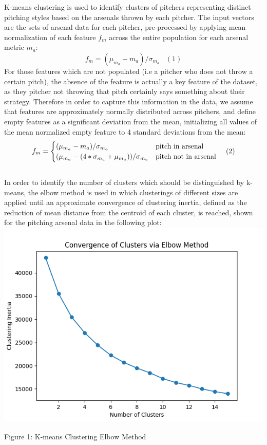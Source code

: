 \documentclass[12 pt]{article}
\begin{document}
\indent K-means clustering is used to identify clusters of pitchers representing 
distinct pitching styles based on the arsenals thrown by each pitcher. The input 
vectors are the sets of arsenal data for each pitcher, pre-processed by applying mean normalization 
of each feature $f_m$ across the entire population for each arsenal metric $m_a$: \[f_m = (\mu_{m_a} - m_a)/ \sigma_{m_a} \;\;\; (1)\] For those 
features which are not populated (i.e a pitcher who does not throw a certain pitch), the absence of the 
feature is actually a key feature of the dataset, as they pitcher not throwing that pitch certainly says something about their strategy.
Therefore in order to capture this information in the data, we assume that features are approximately normally distributed 
across pitchers, and define empty features as a significant deviation from the mean, initializing all values of the
mean normalized empty feature to 4 standard deviations from the mean:
\[f_m = \begin{cases}
    (\mu_{m_a} - m_a)/ \sigma_{m_a} & $pitch in arsenal$ \\
    (\mu_{m_a} - (4 * \sigma_{m_a} + \mu_{m_a}))/ \sigma_{m_a} & $pitch not in arsenal$
\end{cases}\;\;\;\;(2)\]
 \\ \indent In order to identify the number of clusters which should be distinguished by k-means, the 
elbow method is used in which clusterings of different sizes are applied until 
an approximate convergence of clustering inertia, defined as the reduction of mean distance from the centroid of each cluster, 
is reached, shown for the pitching arsenal data in the following plot:\\

\includegraphics{figs/cls_iner.png}
\begin{center}Figure 1: K-means Clustering Elbow Method\end{center}
\end{document}
